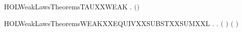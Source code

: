 \newcommand{\HOLWeakLawsDate}{04 Settembre 2019}
\newcommand{\HOLWeakLawsTime}{13:46}
\begin{SaveVerbatim}{HOLWeakLawsTheoremsTAUXXWEAK}
\HOLTokenTurnstile{} \HOLSymConst{\HOLTokenForall{}}.  \ensuremath{(}\HOLConst{\ensuremath{\tau}}\HOLSymConst{\ensuremath{\ldotp}}\ensuremath{)} 
\end{SaveVerbatim}
\newcommand{\HOLWeakLawsTheoremsTAUXXWEAK}{\UseVerbatim{HOLWeakLawsTheoremsTAUXXWEAK}}
\begin{SaveVerbatim}{HOLWeakLawsTheoremsWEAKXXEQUIVXXSUBSTXXSUMXXL}
\HOLTokenTurnstile{} \HOLSymConst{\HOLTokenForall{}} .
          \HOLSymConst{\HOLTokenConj{}}   \HOLSymConst{\HOLTokenConj{}}   \HOLSymConst{\HOLTokenImp{}}
       \HOLSymConst{\HOLTokenForall{}}.  \ensuremath{(} \HOLSymConst{\ensuremath{+}} \ensuremath{)} \ensuremath{(} \HOLSymConst{\ensuremath{+}} \ensuremath{)}
\end{SaveVerbatim}
\newcommand{\HOLWeakLawsTheoremsWEAKXXEQUIVXXSUBSTXXSUMXXL}{\UseVerbatim{HOLWeakLawsTheoremsWEAKXXEQUIVXXSUBSTXXSUMXXL}}
